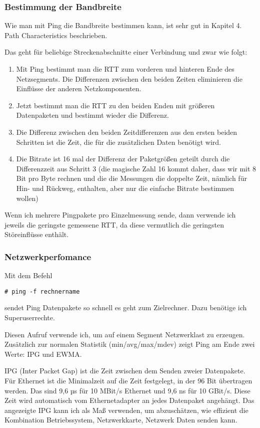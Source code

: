 \begin{normaltext}
  \subsubsection{Bestimmung der Bandbreite}
  Wie man mit Ping die Bandbreite bestimmen kann, ist sehr gut in
  \cite{sloan2001} Kapitel 4. Path Characteristics beschrieben.

  Das geht für beliebige Streckenabschnitte einer Verbindung und zwar wie
  folgt:
  \begin{enumerate}
    \item Mit Ping bestimmt man die RTT zum vorderen und hinteren Ende des
      Netzsegments. Die Differenzen zwischen den beiden Zeiten eliminieren die
      Einflüsse der anderen Netzkomponenten.
    \item Jetzt bestimmt man die RTT zu den beiden Enden mit größeren
      Datenpaketen und bestimmt wieder die Differenz.
    \item Die Differenz zwischen den beiden Zeitdifferenzen aus den ersten
      beiden Schritten ist die Zeit, die für die zusätzlichen Daten benötigt
      wird.
    \item Die Bitrate ist 16 mal der Differenz der Paketgrößen geteilt
      durch die Differenzzeit aus Schritt 3 (die magische Zahl 16 kommt daher,
      dass wir mit 8 Bit pro Byte rechnen und die die Messungen die doppelte
      Zeit, nämlich für Hin- und Rückweg, enthalten, aber nur die einfache
      Bitrate bestimmen wollen)
  \end{enumerate}
  Wenn ich mehrere Pingpakete pro Einzelmessung sende, dann verwende ich
  jeweils die geringste gemessene RTT, da diese vermutlich die geringsten
  Störeinflüsse enthält.

  \subsubsection{Netzwerkperfomance}
  Mit dem Befehl
  \begin{verbatim}
# ping -f rechnername
  \end{verbatim}
  sendet Ping Datenpakete so schnell es geht zum Zielrechner. Dazu benötige
  ich Superuserrechte.

  Diesen Aufruf verwende ich, um auf einem Segment Netzwerklast zu erzeugen.
  Zusätzlich zur normalen Statistik (min/avg/max/mdev) zeigt Ping am Ende zwei
  Werte: IPG und EWMA.

  IPG (Inter Packet Gap) ist die Zeit zwischen dem Senden zweier Datenpakete.
  Für Ethernet ist die Minimalzeit auf die Zeit festgelegt, in der 96 Bit
  übertragen werden. Das sind 9,6 µs für 10 MBit/s Ethernet und 9,6 ns für 10
  GBit/s. Diese Zeit wird automatisch vom Ethernetadapter an jedes Datenpaket
  angehängt. Das angezeigte IPG kann ich als Maß verwenden, um abzuschätzen,
  wie effizient die Kombination Betriebssystem, Netzwerkkarte, Netzwerk Daten
  senden kann.


\end{normaltext}
